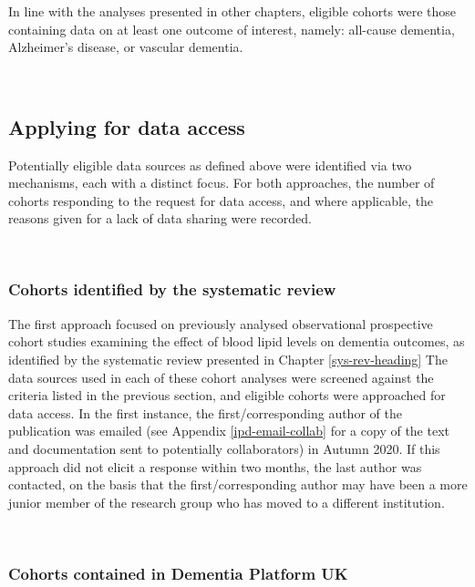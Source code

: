 \documentclass[a4paper, twoside]{templates/ociamthesis}
\begin{document}
In line with the analyses presented in other chapters, eligible cohorts were those containing data on at least one outcome of interest, namely: all-cause dementia, Alzheimer's disease, or vascular dementia.

~

\hypertarget{applying-for-data-access}{%
\subsection{Applying for data access}\label{applying-for-data-access}}

Potentially eligible data sources as defined above were identified via two mechanisms, each with a distinct focus. For both approaches, the number of cohorts responding to the request for data access, and where applicable, the reasons given for a lack of data sharing were recorded.

~

\hypertarget{cohorts-identified-by-the-systematic-review}{%
\subsubsection{Cohorts identified by the systematic review}\label{cohorts-identified-by-the-systematic-review}}

The first approach focused on previously analysed observational prospective cohort studies examining the effect of blood lipid levels on dementia outcomes, as identified by the systematic review presented in Chapter \ref{sys-rev-heading} The data sources used in each of these cohort analyses were screened against the criteria listed in the previous section, and eligible cohorts were approached for data access. In the first instance, the first/corresponding author of the publication was emailed (see Appendix \ref{ipd-email-collab} for a copy of the text and documentation sent to potentially collaborators) in Autumn 2020. If this approach did not elicit a response within two months, the last author was contacted, on the basis that the first/corresponding author may have been a more junior member of the research group who has moved to a different institution.

~

\hypertarget{cohorts-contained-in-dementia-platform-uk}{%
\subsubsection{Cohorts contained in Dementia Platform UK}\label{cohorts-contained-in-dementia-platform-uk}}
\end{document}
